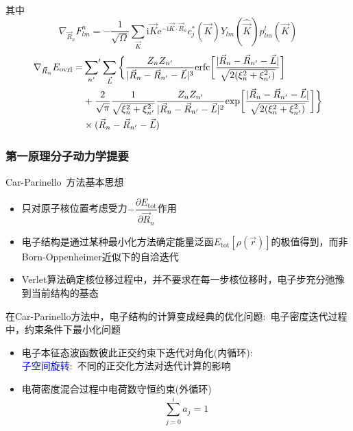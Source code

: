 {\begin{itemize}
{{\begin{itemize}
{{\begin{displaymath}
\end{displaymath}
				}}
			\end{itemize}
			其中
			\begin{displaymath}
				\nabla_{\vec R_n}F_{lm}^n=-\dfrac1{\sqrt{\Omega}}\sum_{\vec K}\mathrm{i}\vec K\mathrm{e}^{-\mathrm{i}\vec K\cdot\vec R_n}c_j^{\ast}(\vec K)Y_{lm}(\hat{\vec K})p_{lm}^l(\vec K)
			\end{displaymath}
			\begin{displaymath}
				\begin{aligned}
					\nabla_{\vec R_n}E_{\mathrm{ovrl}}=&\sideset{}{^{\prime}}\sum_{n^{\prime}}\sum_{\vec L}\bigg\{\dfrac{Z_nZ_{n^{\prime}}}{|\vec R_n-\vec R_{n^{\prime}}-\vec L|^3}\mathrm{erfc}\bigg[\dfrac{|\vec R_n-\vec R_{n^{\prime}}-\vec L|}{\sqrt{2(\xi_n^2+\xi_{n^{\prime}}^2)}}\bigg]\\
					&+\dfrac2{\sqrt{\pi}}\dfrac1{\sqrt{\xi_n^2+\xi_{n^{\prime}}^2}}\dfrac{Z_nZ_{n^{\prime}}}{|\vec R_n-\vec R_{n^{\prime}}-\vec L|^2}\mathrm{exp}\bigg[\dfrac{|\vec R_n-\vec R_{n^{\prime}}-\vec L|}{\sqrt{2(\xi_n^2+\xi_{n^{\prime}}^2)}}\bigg]\bigg\}\\
					&\times(\vec R_n-\vec R_{n^{\prime}}-\vec L)
				\end{aligned}
			\end{displaymath}
		}}
	\end{itemize}

}

\frame
{
	\frametitle{第一原理分子动力学提要}
	\textrm{Car-Parinello~}方法基本思想
	\begin{itemize}
		\item 只对原子核位置考虑受力$-\dfrac{\partial E_{\mathrm{tot}}}{\partial\vec R_n}$作用
		\item 电子结构是通过某种最小化方法确定能量泛函$E_{\mathrm{tot}}[\rho(\vec r)]$的极值得到，而非\textrm{Born-Oppenheimer}近似下的自洽迭代
		\item \textrm{Verlet}算法确定核位移过程中，并不要求在每一步核位移时，电子步充分弛豫到当前结构的基态
	\end{itemize}
	在\textrm{Car-Parinello}方法中，电子结构的计算变成经典的优化问题:~电子密度迭代过程中，约束条件下最小化问题
	\begin{itemize}
		\item 电子本征态波函数彼此正交约束下迭代对角化(内循环):\\
			\textcolor{blue}{子空间旋转}:~不同的正交化方法对迭代计算的影响
		\item 电荷密度混合过程中电荷数守恒约束(外循环)
			\begin{displaymath}
				\sum\limits_{j=0}^i a_j=1
			\end{displaymath}
	\end{itemize}
}

